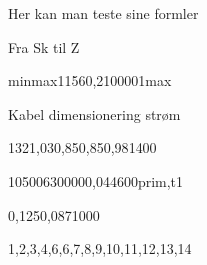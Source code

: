 \documentclass[a4paper,oneside,10pt,danish]{report}
\begin{document}
Her kan man teste sine formler

 
Fra Sk til Z
\begin{FraSkTilZ}{min}{max}{115}{6}{0,2}{10000}{1}{max}
\end{FraSkTilZ}

Kabel dimensionering strøm
\begin{Iz,min}{132}{1,03}{0,85}{0,85}{0,98}{1}{400}
\end{Iz,min}

\begin{Ztrafo}{10500}{630000}{0,04}{4600}{prim,t1}
\end{Ztrafo}

\begin{Zkabel}{1}{0,125}{0,087}{1000}
\end{Zkabel}

\begin{Stringtest}{1,2,3,4,6,6,7,8,9,10,11,12,13,14}
\end{Stringtest}
\end{document}

